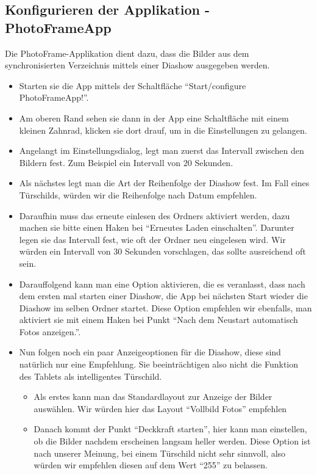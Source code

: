 \begin{flushleft}
  \subsection{Konfigurieren der Applikation - PhotoFrameApp}
  	Die PhotoFrame-Applikation dient dazu, dass die Bilder aus dem synchronisierten Verzeichnis mittels einer Diashow ausgegeben werden.
    \begin{itemize}
      \item Starten sie die App mittels der Schaltfläche ``Start/configure PhotoFrameApp!''.
      \item Am oberen Rand sehen sie dann in der App eine Schaltfläche mit einem kleinen Zahnrad, klicken sie dort drauf, um in die Einstellungen zu gelangen.
      \item Angelangt im Einstellungsdialog, legt man zuerst das Intervall zwischen den Bildern fest. Zum Beispiel ein Intervall von 20 Sekunden.
      \item Als nächstes legt man die Art der Reihenfolge der Diashow fest. Im Fall eines Türschilds, würden wir die Reihenfolge nach Datum empfehlen.
      \item Daraufhin muss das erneute einlesen des Ordners aktiviert werden, dazu machen sie bitte einen Haken bei ``Erneutes Laden einschalten''. Darunter legen sie das Intervall fest, wie oft der Ordner neu eingelesen wird. Wir würden ein Intervall von 30 Sekunden vorschlagen, das sollte ausreichend oft sein.
      \item Darauffolgend kann man eine Option aktivieren, die es veranlasst, dass nach dem ersten mal starten einer Diashow, die App bei nächsten Start wieder die Diashow im selben Ordner startet. Diese Option empfehlen wir ebenfalls, man aktiviert sie mit einem Haken bei Punkt ``Nach dem Neustart automatisch Fotos anzeigen.''.
      \item Nun folgen noch ein paar Anzeigeoptionen für die Diashow, diese sind natürlich nur eine Empfehlung. Sie beeinträchtigen also nicht die Funktion des Tablets als intelligentes Türschild.
      \begin{itemize}
        \item Als erstes kann man das Standardlayout zur Anzeige der Bilder auswählen. Wir würden hier das Layout ``Vollbild Fotos'' empfehlen
        \item Danach kommt der Punkt ``Deckkraft starten'', hier kann man einstellen, ob die Bilder nachdem erscheinen langsam heller werden. Diese Option ist nach unserer Meinung, bei einem Türschild nicht sehr sinnvoll, also würden wir empfehlen diesen auf dem Wert ``255'' zu belassen.

\end{itemize}
\end{itemize}
\end{flushleft}
